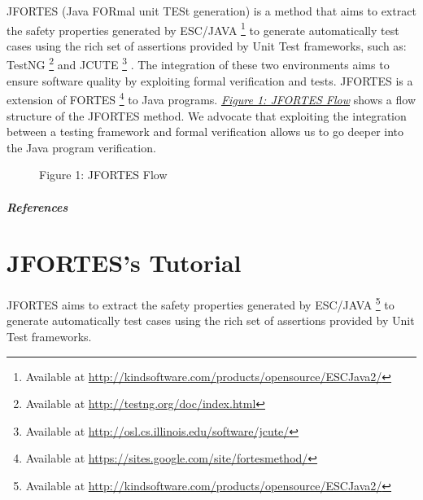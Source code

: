 \documentclass[letterpaper,10pt,english]{sphinxmanual}
\begin{document}
JFORTES  (Java FORmal unit TESt generation) is a method that aims to extract the safety properties generated
by ESC/JAVA \footnote{
Available at \href{http://kindsoftware.com/products/opensource/ESCJava2/}{http://kindsoftware.com/products/opensource/ESCJava2/}
} to generate automatically test cases using the rich set of assertions provided by Unit Test
frameworks, such as: TestNG \footnote{
Available at \href{http://testng.org/doc/index.html}{http://testng.org/doc/index.html}
} and JCUTE \footnote{
Available at \href{http://osl.cs.illinois.edu/software/jcute/}{http://osl.cs.illinois.edu/software/jcute/}
} . The integration of these two environments aims to ensure software
quality by exploiting formal verification and tests. JFORTES is a extension of FORTES \footnote{
Available at \href{https://sites.google.com/site/fortesmethod/}{https://sites.google.com/site/fortesmethod/}
} to Java programs.
{\hyperref[sections/intro:fig-flow-jfortes]{\emph{Figure 1: JFORTES Flow}}} shows a flow structure of the JFORTES method.
We advocate that exploiting the integration between a testing framework and formal verification allows
us to go deeper into the Java program verification.
\begin{figure}[htbp]
\centering
\capstart

\caption{Figure 1: JFORTES Flow}\label{sections/intro:fig-flow-jfortes}\end{figure}
\paragraph{References}


\chapter{JFORTES's Tutorial}
\label{sections/tutorial::doc}\label{sections/tutorial:jfortes-s-tutorial}
JFORTES aims to extract the safety properties generated by ESC/JAVA \footnote{
Available at \href{http://kindsoftware.com/products/opensource/ESCJava2/}{http://kindsoftware.com/products/opensource/ESCJava2/}
} to generate automatically
test cases using the rich set of assertions provided by Unit Test frameworks.
\end{document}
